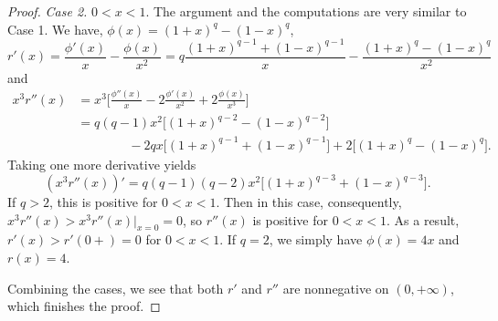 \documentclass[10pt]{article}
\newcommand{\1}{\textbf{1}}
\newtheorem{lemma}[theorem]{Lemma}
\theoremstyle{remark}
\theoremstyle{definition}
\begin{document}
\begin{proof}
\bigskip
\noindent
\emph{Case 2.} $0 < x < 1$. The argument and the computations are very similar to Case 1. We have, $\phi(x) = (1+x)^q - (1-x)^q$,
\[
r'(x) = \frac{\phi'(x)}{x} - \frac{\phi(x)}{x^2} = q\frac{(1+x)^{q-1}+(1-x)^{q-1}}{x} - \frac{(1+x)^q-(1-x)^q}{x^2}
\]
and
\begin{align*}
x^3r''(x) &= x^3\Bigg[\frac{\phi''(x)}{x}-2\frac{\phi'(x)}{x^2}+2\frac{\phi(x)}{x^3}\Bigg] \\
&=q(q-1)x^2\Big[(1+x)^{q-2}-(1-x)^{q-2}\Big] \\
&\qquad\qquad-2qx\Big[(1+x)^{q-1}+(1-x)^{q-1}\Big]+ 2\Big[(1+x)^q-(1-x)^q\Big].
\end{align*}
Taking one more derivative yields
\[
(x^3r''(x))' = q(q-1)(q-2)x^2\Big[(1+x)^{q-3}+(1-x)^{q-3}\Big].
\]
If $q > 2$, this is positive for $0 < x < 1$. Then in this case, consequently, $x^3r''(x) > x^3r''(x)\Big|_{x=0} = 0$, so $r''(x)$ is positive for $0 < x < 1$. As a result, $r'(x) > r'(0+) = 0$ for $0 < x < 1$. If $q = 2$, we simply have $\phi(x) = 4x$ and $r(x) = 4$. 

Combining the cases, we see that both $r'$ and $r''$ are nonnegative on $(0,+\infty)$, which finishes the proof.
\end{proof}

\end{document}
